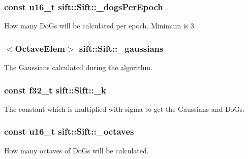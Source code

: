 \subsubsection[{\+\_\+dogs\+Per\+Epoch}]{\setlength{\rightskip}{0pt plus 5cm}const {\bf u16\+\_\+t} sift\+::\+Sift\+::\+\_\+dogs\+Per\+Epoch\hspace{0.3cm}{\ttfamily [private]}}\label{classsift_1_1Sift_af19650a2ebf77ebeab8971275d74e3d2}
How many Do\+Gs will be calculated per epoch. Minimum is 3. \hypertarget{classsift_1_1Sift_ae32f5839b1a8b29eb4196953175ed61b}{}
\subsubsection[{\+\_\+gaussians}]{$<${\bf Octave\+Elem}$>$ sift\+::\+Sift\+::\+\_\+gaussians\hspace{0.3cm}{\ttfamily [private]}}\label{classsift_1_1Sift_ae32f5839b1a8b29eb4196953175ed61b}
The Gaussians calculated during the algorithm. \hypertarget{classsift_1_1Sift_ae1b7ec852e3b6a0fa171b6ad1a5da300}{}
\subsubsection[{\+\_\+k}]{\setlength{\rightskip}{0pt plus 5cm}const {\bf f32\+\_\+t} sift\+::\+Sift\+::\+\_\+k\hspace{0.3cm}{\ttfamily [private]}}\label{classsift_1_1Sift_ae1b7ec852e3b6a0fa171b6ad1a5da300}
The constant which is multiplied with sigma to get the Gaussians and Do\+Gs. \hypertarget{classsift_1_1Sift_abfc7b5cabd32b25b0eba8d830477bab6}{}
\subsubsection[{\+\_\+octaves}]{\setlength{\rightskip}{0pt plus 5cm}const {\bf u16\+\_\+t} sift\+::\+Sift\+::\+\_\+octaves\hspace{0.3cm}{\ttfamily [private]}}\label{classsift_1_1Sift_abfc7b5cabd32b25b0eba8d830477bab6}
How many octaves of Do\+Gs will be calculated. \hypertarget{classsift_1_1Sift_a29f9dbb5de3aaed524aebaa6cddc4d50}{}
